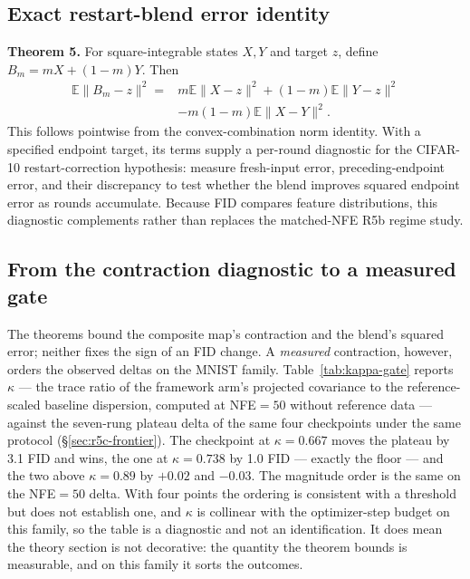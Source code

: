 \documentclass[journal,twocolumn,final]{IEEEtran}
\begin{document}
\subsection{Exact restart-blend error identity}
\textbf{Theorem 5.} For square-integrable states $X,Y$ and target $z$, define $B_m=mX+(1-m)Y$. Then
\begin{equation}
\begin{aligned}\mathbb{E}\|B_m-z\|^2={}&m\mathbb{E}\|X-z\|^2+(1-m)\mathbb{E}\|Y-z\|^2\\&-m(1-m)\mathbb{E}\|X-Y\|^2.\end{aligned}
\end{equation}
This follows pointwise from the convex-combination norm identity. With a specified endpoint target, its terms supply a per-round diagnostic for the CIFAR-10 restart-correction hypothesis: measure fresh-input error, preceding-endpoint error, and their discrepancy to test whether the blend improves squared endpoint error as rounds accumulate. Because FID compares feature distributions, this diagnostic complements rather than replaces the matched-NFE R5b regime study.

\subsection{From the contraction diagnostic to a measured gate}
The theorems bound the composite map's contraction and the blend's squared error; neither fixes the sign of an FID change. A \emph{measured} contraction, however, orders the observed deltas on the MNIST family. Table~\ref{tab:kappa-gate} reports $\kappa$ --- the trace ratio of the framework arm's projected covariance to the reference-scaled baseline dispersion, computed at NFE$=50$ without reference data --- against the seven-rung plateau delta of the same four checkpoints under the same protocol (\S\ref{sec:r5c-frontier}). The checkpoint at $\kappa=0.667$ moves the plateau by 3.1 FID and wins, the one at $\kappa=0.738$ by 1.0 FID --- exactly the floor --- and the two above $\kappa=0.89$ by $+0.02$ and $-0.03$. The magnitude order is the same on the NFE$=50$ delta. With four points the ordering is consistent with a threshold but does not establish one, and $\kappa$ is collinear with the optimizer-step budget on this family, so the table is a diagnostic and not an identification. It does mean the theory section is not decorative: the quantity the theorem bounds is measurable, and on this family it sorts the outcomes.
\end{document}
